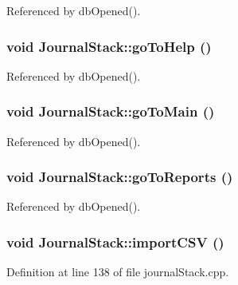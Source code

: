 Referenced by db\-Opened().\hypertarget{classJournalStack_l3}{
\subsubsection[goToHelp]{\setlength{\rightskip}{0pt plus 5cm}void Journal\-Stack::go\-To\-Help ()}}
\label{classJournalStack_l3}




Referenced by db\-Opened().\hypertarget{classJournalStack_l0}{
\subsubsection[goToMain]{\setlength{\rightskip}{0pt plus 5cm}void Journal\-Stack::go\-To\-Main ()}}
\label{classJournalStack_l0}




Referenced by db\-Opened().\hypertarget{classJournalStack_l2}{
\subsubsection[goToReports]{\setlength{\rightskip}{0pt plus 5cm}void Journal\-Stack::go\-To\-Reports ()}}
\label{classJournalStack_l2}




Referenced by db\-Opened().\hypertarget{classJournalStack_k1}{
\subsubsection[importCSV]{\setlength{\rightskip}{0pt plus 5cm}void Journal\-Stack::import\-CSV ()}}
\label{classJournalStack_k1}


Definition at line 138 of file journal\-Stack.cpp.

